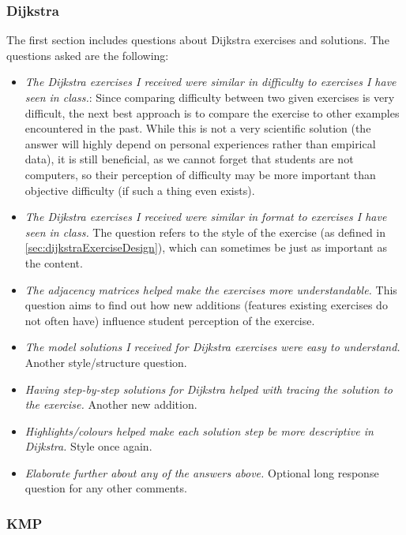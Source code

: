 \documentclass{l4proj}
\begin{document}
\subsubsection{Dijkstra}

The first section includes questions about Dijkstra exercises and solutions. The questions asked are the following:

\begin{itemize}
	\item
	\emph{The Dijkstra exercises I received were similar in difficulty to exercises I have seen in class.}: Since comparing difficulty between two given exercises is very difficult, the next best approach is to compare the exercise to other examples encountered in the past. While this is not a very scientific solution (the answer will highly depend on personal experiences rather than empirical data), it is still beneficial, as we cannot forget that students are not computers, so their perception of difficulty may be more important than objective difficulty (if such a thing even exists).
	\item
	\emph{The Dijkstra exercises I received were similar in format to exercises I have seen in class.} The question refers to the style of the exercise (as defined in \autoref{sec:dijkstraExerciseDesign}), which can sometimes be just as important as the content.
	\item
	\emph{The adjacency matrices helped make the exercises more understandable.} This question aims to find out how new additions (features existing exercises do not often have) influence student perception of the exercise.
	\item
	\emph{The model solutions I received for Dijkstra exercises were easy to understand.} Another style/structure question.
	\item
	\emph{Having step-by-step solutions for Dijkstra helped with tracing the solution to the exercise.} Another new addition.
	\item
	\emph{Highlights/colours helped make each solution step be more descriptive in Dijkstra.} Style once again.
	\item
	\emph{Elaborate further about any of the answers above.} Optional long response question for any other comments.
\end{itemize}

\subsubsection{KMP}
\end{document}
